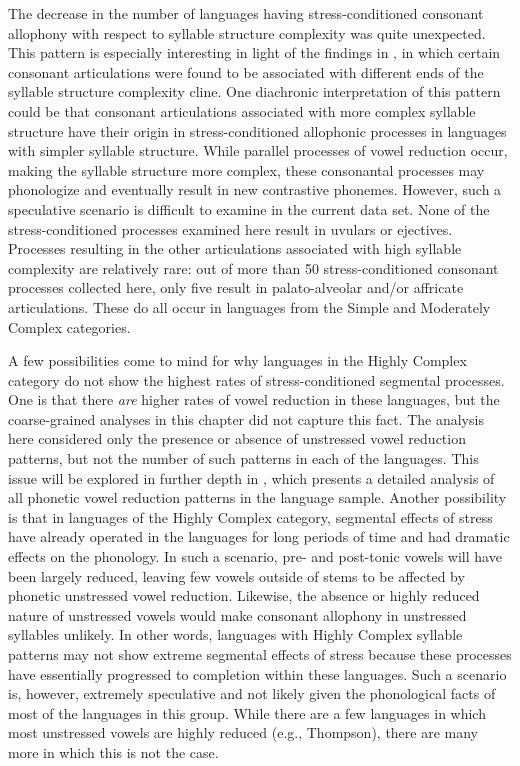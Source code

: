   The decrease in the number of languages having stress-conditioned consonant allophony with respect to syllable structure complexity was quite unexpected. This pattern is especially interesting in light of the findings in , in which certain consonant articulations were found to be associated with different ends of the syllable structure complexity cline. One diachronic interpretation of this pattern could be that consonant articulations associated with more complex syllable structure have their origin in stress-conditioned allophonic processes in languages with simpler syllable structure. While parallel processes of vowel reduction occur, making the syllable structure more complex, these consonantal processes may phonologize and eventually result in new contrastive phonemes. However, such a speculative scenario is difficult to examine in the current data set. None of the stress-conditioned processes examined here result in uvulars or ejectives. Processes resulting in the other articulations associated with high syllable complexity are relatively rare: out of more than 50 stress-conditioned consonant processes collected here, only five result in palato-alveolar and/or affricate articulations. These do all occur in languages from the Simple and Moderately Complex categories.

  A few possibilities come to mind for why languages in the Highly Complex category do not show the highest rates of stress-conditioned segmental processes. One is that there \textit{are} higher rates of vowel reduction in these languages, but the coarse-grained analyses in this chapter did not capture this fact. The analysis here considered only the presence or absence of unstressed vowel reduction patterns, but not the number of such patterns in each of the languages. This issue will be explored in further depth in , which presents a detailed analysis of all phonetic vowel reduction patterns in the language sample. Another possibility is that in languages of the Highly Complex category, segmental effects of stress have already operated in the languages for long periods of time and had dramatic effects on the phonology. In such a scenario, pre- and post-tonic vowels will have been largely reduced, leaving few vowels outside of stems to be affected by phonetic unstressed vowel reduction. Likewise, the absence or highly reduced nature of unstressed vowels would make consonant allophony in unstressed syllables unlikely. In other words, languages with Highly Complex syllable patterns may not show extreme segmental effects of stress because these processes have essentially progressed to completion within these languages. Such a scenario is, however, extremely speculative and not likely given the phonological facts of most of the languages in this group. While there are a few languages in which most unstressed vowels are highly reduced (e.g., Thompson), there are many more in which this is not the case.

